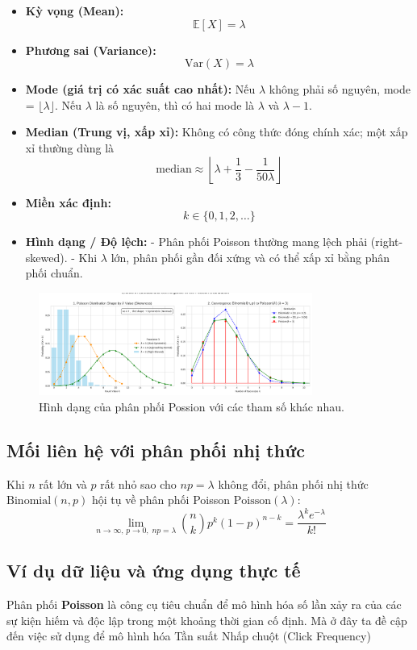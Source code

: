 \begin{itemize}
  \item \textbf{Kỳ vọng (Mean):}  
  \[
    \mathbb{E}[X] = \lambda
  \]
  \item \textbf{Phương sai (Variance):}  
  \[
    \mathrm{Var}(X) = \lambda
  \]
  \item \textbf{Mode (giá trị có xác suất cao nhất):}  
  Nếu $\lambda$ không phải số nguyên, mode = $\lfloor \lambda \rfloor$.  
  Nếu $\lambda$ là số nguyên, thì có hai mode là $\lambda$ và $\lambda - 1$. 
  \item \textbf{Median (Trung vị, xấp xỉ):}  
  Không có công thức đóng chính xác; một xấp xỉ thường dùng là  
  \[
    \mathrm{median} \approx \left\lfloor \lambda + \frac{1}{3} - \frac{1}{50\lambda} \right\rfloor
  \] 
  \item \textbf{Miền xác định:}  
  \[
    k \in \{0, 1, 2, \dots\}
  \]
  \item \textbf{Hình dạng / Độ lệch:}  
  - Phân phối Poisson thường mang lệch phải (right-skewed).  
  - Khi $\lambda$ lớn, phân phối gần đối xứng và có thể xấp xỉ 
  bằng phân phối chuẩn.   
\end{itemize}
\begin{figure}[h!]
    \centering
    \includegraphics[width=0.8\textwidth]{images/Poisson_Shape_and_Binomial_Convergence.png}
    \caption{Hình dạng của phân phối Possion với các tham số khác nhau.}
    \label{fig:poisson_dist}
\end{figure}
\subsection{Mối liên hệ với phân phối nhị thức}


Khi $n$ rất lớn và $p$ rất nhỏ sao cho $np = \lambda$ không đổi, phân phối nhị thức $\mathrm{Binomial}(n, p)$ hội tụ về phân phối Poisson $\mathrm{Poisson}(\lambda)$:  
\[
\lim_{n \to \infty,\, p \to 0,\; np = \lambda} \binom{n}{k} p^k (1 - p)^{n-k} = \frac{\lambda^k e^{-\lambda}}{k!}
\]

\subsection*{Ví dụ dữ liệu và ứng dụng thực tế }
Phân phối \textbf{Poisson} là công cụ tiêu chuẩn để mô hình hóa 
số lần xảy ra của các sự kiện hiếm và độc lập trong một khoảng thời gian cố định.
Mà ở đây ta đề cập đến việc sử dụng để mô hình hóa Tần suất Nhấp chuột (Click Frequency)

